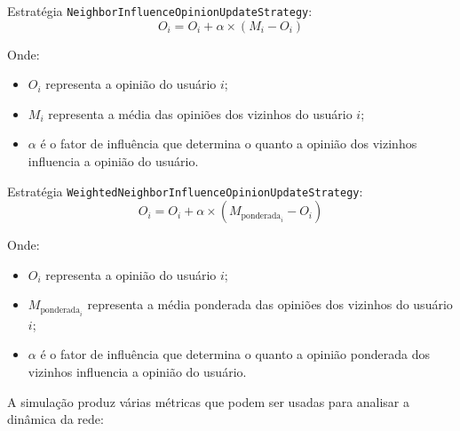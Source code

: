 Estratégia \texttt{NeighborInfluenceOpinionUpdateStrategy}:
\begin{equation*}
	O_i = O_i + \alpha \times (M_i - O_i)
\end{equation*}

Onde:

\begin{itemize}
	\item $O_i$ representa a opinião do usuário $i$;
	\item $M_i$ representa a média das opiniões dos vizinhos do usuário $i$;
	\item $\alpha$ é o fator de influência que determina o quanto a opinião dos vizinhos influencia a opinião do usuário.
\end{itemize}

Estratégia \texttt{WeightedNeighborInfluenceOpinionUpdateStrategy}:
\begin{equation*}
	O_i = O_i + \alpha \times (M_{\text{ponderada}_i} - O_i)
\end{equation*}

Onde:

\begin{itemize}
	\item $O_i$ representa a opinião do usuário $i$;
	\item $M_{\text{ponderada}_i}$ representa a média ponderada das opiniões dos vizinhos do usuário $i$;
	\item $\alpha$ é o fator de influência que determina o quanto a opinião ponderada dos vizinhos influencia a opinião do usuário.
\end{itemize}

A simulação produz várias métricas que podem ser usadas para analisar a dinâmica da rede:

